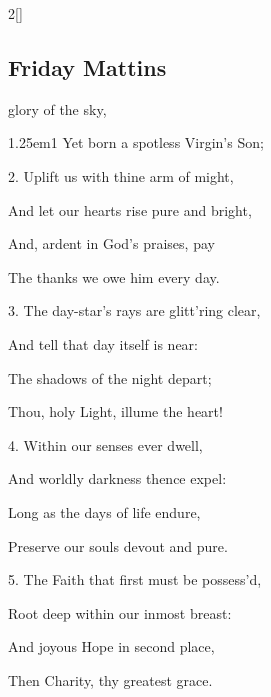 \begin{paracol}{2}[]
\sloppy

\subsection{Friday Mattins}\label{FridayMattins}

 glory of the sky,



\begin{hangparas}{1.25em}{1}
Yet born a spotless Virgin’s Son;%

\vspace{0.5\baselineskip}

2. Uplift us with thine arm of might,

And let our hearts rise pure and bright,

And, ardent in God's praises, pay

The thanks we owe him every day.%

\vspace{0.5\baselineskip}

3. The day-star's rays are glitt'ring clear,

And tell that day itself is near:

The shadows of the night depart;

Thou, holy Light, illume the heart!%

\vspace{0.5\baselineskip}

4. Within our senses ever dwell,

And worldly darkness thence expel:

Long as the days of life endure,

Preserve our souls devout and pure.%

\vspace{0.5\baselineskip}

5. The Faith that first must be possess'd,

Root deep within our inmost breast:

And joyous Hope in second place,

Then Charity, thy greatest grace.%


\end{hangparas}
\end{paracol}
